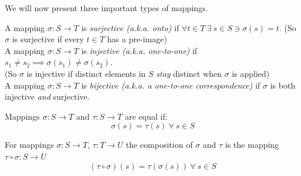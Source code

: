 \noindent We will now present three important types of mappings.

\begin{definition}
\label{def:surj_inj_bij}
A mapping $\sigma: S\rightarrow T$ is \textit{surjective (a.k.a. onto)} if $\forall t\in T \ \exists \ s\in S \ni \sigma(s)=t$. (So $\sigma$ is surjective if every $t\in T$ has a pre-image)\steezybreak\\
A mapping $\sigma: S\rightarrow T$ is \textit{injective (a.k.a. one-to-one)} if $s_1\neq s_2 \implies \sigma(s_1)\neq \sigma(s_2)$. \\(So $\sigma$ is injective if distinct elements in $S$ \textit{stay} distinct when $\sigma$ is applied)\steezybreak\\
A mapping $\sigma: S\rightarrow T$ is \textit{bijective (a.k.a. a one-to-one correspondence)} if $\sigma$ is both injective \textit{and} surjective.
\end{definition}
\begin{definition}
Mappings $\sigma : S \rightarrow T$ and $\tau: S \rightarrow T$ are equal if:
\begin{equation}
    \sigma(s)=\tau(s) \ \forall \ s\in S\nonumber
\end{equation}
\end{definition}
\begin{definition}
For mappings $\sigma: S\rightarrow T$, $\tau: T\rightarrow U$ the composition of $\sigma$ and $\tau$ is the mapping $\tau \circ \sigma: S\rightarrow U$ 
\begin{equation}
    (\tau \circ \sigma)(s) = \tau(\sigma(s)) \ \forall \ s \in S \nonumber
\end{equation}
\end{definition}
